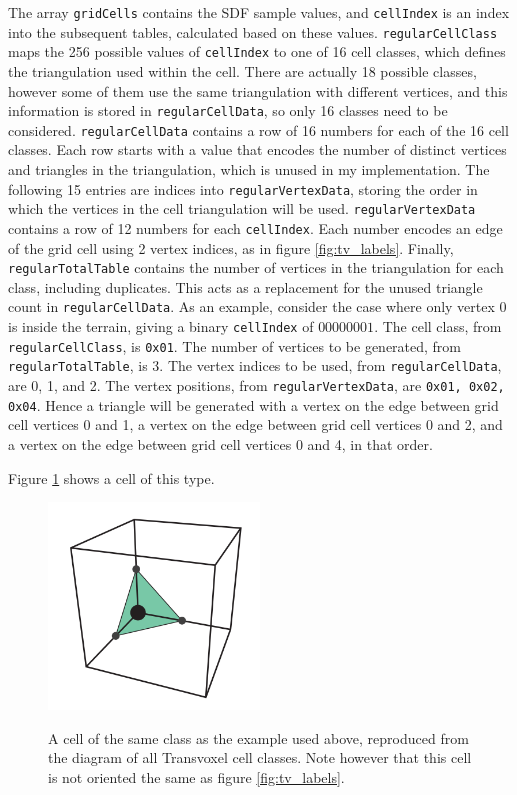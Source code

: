 \documentclass[11pt]{article}
\begin{document}
The array \texttt{gridCells} contains the SDF sample values, and \texttt{cellIndex} is an index into the subsequent tables, calculated based on these values. 
\texttt{regularCellClass} maps the 256 possible values of \texttt{cellIndex} to one of 16 cell classes, which defines the triangulation used within the cell. There are actually 18 possible classes, however some of them use the same triangulation with different vertices, and this information is stored in \texttt{regularCellData}, so only 16 classes need to be considered. 
\texttt{regularCellData} contains a row of 16 numbers for each of the 16 cell classes. Each row starts with a value that encodes the number of distinct vertices and triangles in the triangulation, which is unused in my implementation. The following 15 entries are indices into \texttt{regularVertexData}, storing the order in which the vertices in the cell triangulation will be used. 
\texttt{regularVertexData} contains a row of 12 numbers for each \texttt{cellIndex}. Each number encodes an edge of the grid cell using 2 vertex indices, as in figure \ref{fig:tv_labels}. 
Finally, \texttt{regularTotalTable} contains the number of vertices in the triangulation for each class, including duplicates. This acts as a replacement for the unused triangle count in \texttt{regularCellData}.
As an example, consider the case where only vertex 0 is inside the terrain, giving a binary \texttt{cellIndex} of $00000001$. The cell class, from \texttt{regularCellClass}, is \texttt{0x01}. The number of vertices to be generated, from \texttt{regularTotalTable}, is 3. The vertex indices to be used, from \texttt{regularCellData}, are 0, 1, and 2. The vertex positions, from \texttt{regularVertexData}, are \texttt{0x01, 0x02, 0x04}. Hence a triangle will be generated with a vertex on the edge between grid cell vertices 0 and 1, a vertex on the edge between grid cell vertices 0 and 2, and a vertex on the edge between grid cell vertices 0 and 4, in that order.

Figure \ref{fig:regular_cell_example_case} shows a cell of this type.
\begin{figure}
  \caption{A cell of the same class as the example used above, reproduced from the diagram of all Transvoxel cell classes\cite{lengyel}. Note however that this cell is not oriented the same as figure \ref{fig:tv_labels}.}
  \includegraphics[width=0.5\textwidth]{regular_cell_example_case.PNG}
  \label{fig:regular_cell_example_case}
\end{figure}
\end{document}
